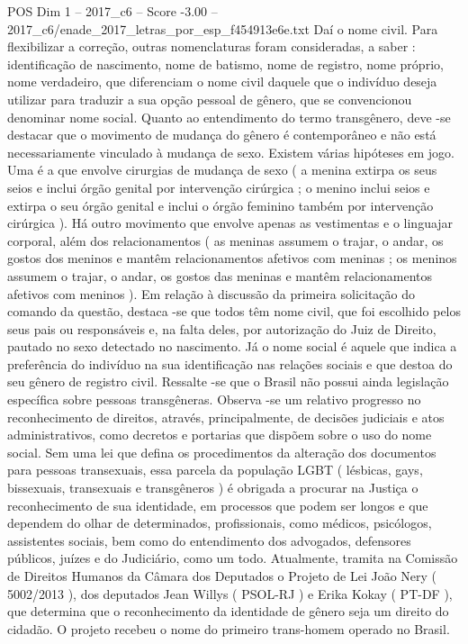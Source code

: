 \begin{textsample}{POS Dim 1 – 2017\_c6 – Score -3.00 – 2017\_c6/enade\_2017\_letras\_por\_esp\_f454913e6e.txt}
Daí o nome civil.
Para flexibilizar a correção, outras nomenclaturas foram consideradas, a saber : identificação de nascimento, nome de batismo, nome de registro, nome próprio, nome verdadeiro, que diferenciam o nome civil daquele que o indivíduo deseja utilizar para traduzir a sua opção pessoal de gênero, que se convencionou denominar nome social.
Quanto ao entendimento do termo transgênero, deve -se destacar que o movimento de mudança do gênero é contemporâneo e não está necessariamente vinculado à mudança de sexo.
Existem várias hipóteses em jogo.
Uma é a que envolve cirurgias de mudança de sexo ( a menina extirpa os seus seios e inclui órgão genital por intervenção cirúrgica ; o menino inclui seios e extirpa o seu órgão genital e inclui o órgão feminino também por intervenção cirúrgica ).
Há outro movimento que envolve apenas as vestimentas e o linguajar corporal, além dos relacionamentos ( as meninas assumem o trajar, o andar, os gostos dos meninos e mantêm relacionamentos afetivos com meninas ; os meninos assumem o trajar, o andar, os gostos das meninas e mantêm relacionamentos afetivos com meninos ).
Em relação à discussão da primeira solicitação do comando da questão, destaca -se que todos têm nome civil, que foi escolhido pelos seus pais ou responsáveis e, na falta deles, por autorização do Juiz de Direito, pautado no sexo detectado no nascimento.
Já o nome social é aquele que indica a preferência do indivíduo na sua identificação nas relações sociais e que destoa do seu gênero de registro civil.
Ressalte -se que o Brasil não possui ainda legislação específica sobre pessoas transgêneras.
Observa -se um relativo progresso no reconhecimento de direitos, através, principalmente, de decisões judiciais e atos administrativos, como decretos e portarias que dispõem sobre o uso do nome social.
Sem uma lei que defina os procedimentos da alteração dos documentos para pessoas transexuais, essa parcela da população LGBT ( lésbicas, gays, bissexuais, transexuais e transgêneros ) é obrigada a procurar na Justiça o reconhecimento de sua identidade, em processos que podem ser longos e que dependem do olhar de determinados, profissionais, como médicos, psicólogos, assistentes sociais, bem como do entendimento dos advogados, defensores públicos, juízes e do Judiciário, como um todo.
Atualmente, tramita na Comissão de Direitos Humanos da Câmara dos Deputados o Projeto de Lei João Nery ( 5002/2013 ), dos deputados Jean Willys ( PSOL-RJ ) e Erika Kokay ( PT-DF ), que determina que o reconhecimento da identidade de gênero seja um direito do cidadão.
O projeto recebeu o nome do primeiro trans-homem operado no Brasil.

\end{textsample}
